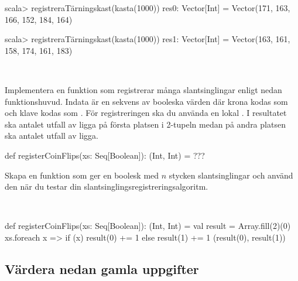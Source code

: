 \SubtaskSolved
\begin{REPL}
scala> registreraTärningskast(kasta(1000))
res0: Vector[Int] = Vector(171, 163, 166, 152, 184, 164)

scala> registreraTärningskast(kasta(1000))
res1: Vector[Int] = Vector(163, 161, 158, 174, 161, 183)
\end{REPL}

\QUESTEND






\ExtraTasks %


\QUESTBEGIN

\Task \what~

\Subtask Implementera en funktion som registrerar många slantsinglingar enligt nedan funktionshuvud. Indata är en sekvens av booleska värden där krona kodas som  och klave kodas som . För registreringen ska du använda en lokal . I resultatet ska antalet utfall av  ligga på första platsen i 2-tupeln medan på andra platsen ska antalet utfall av  ligga.

\begin{Code}
def registerCoinFlips(xs: Seq[Boolean]): (Int, Int) = ???
\end{Code}

\Subtask Skapa en funktion  som ger en boolesk  med $n$ stycken slantsinglingar och använd den när du testar din slantsinglingsregistreringsalgoritm.

\SOLUTION

\TaskSolved \what~

\SubtaskSolved
\begin{Code}
def registerCoinFlips(xs: Seq[Boolean]): (Int, Int) = {
  val result = Array.fill(2)(0)
  xs.foreach{ x =>
    if (x) result(0) += 1 else result(1) += 1
  }
  (result(0), result(1))
}
\end{Code}

\SubtaskSolved



\QUESTEND


\AdvancedTasks %



\subsection{\TODO Värdera nedan gamla uppgifter}


